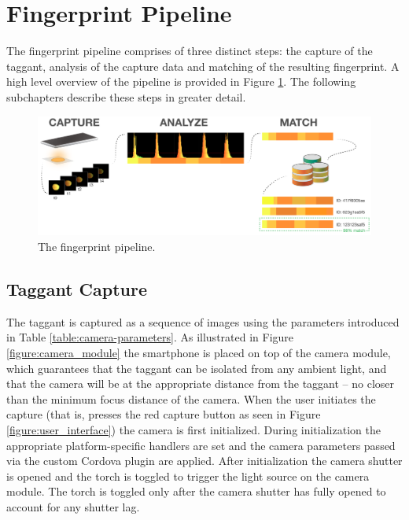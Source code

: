 \documentclass[thesis.tex]{subfiles}
\begin{document}
\section{Fingerprint Pipeline}
\label{chapter:fingerprint-pipeline}

The fingerprint pipeline comprises of three distinct steps: the capture of the taggant, analysis of the capture data and matching of the resulting fingerprint. A high level overview of the pipeline is provided in Figure \ref{figure:fingerprint-pipeline}. The following subchapters describe these steps in greater detail.

\begin{figure}[h]
\centering \includegraphics[width=\textwidth,height=\textheight,keepaspectratio=true]{images/design_implementation/fingerprint_pipeline.pdf}
\caption{The fingerprint pipeline. \label{figure:fingerprint-pipeline}}
\end{figure}

\subsection{Taggant Capture}

The taggant is captured as a sequence of images using the parameters introduced in Table \ref{table:camera-parameters}. As illustrated in Figure \ref{figure:camera_module} the smartphone is placed on top of the camera module, which guarantees that the taggant can be isolated from any ambient light, and that the camera will be at the appropriate distance from the taggant -- no closer than the minimum focus distance of the camera. When the user initiates the capture (that is, presses the red capture button as seen in Figure \ref{figure:user_interface}) the camera is first initialized. During initialization the appropriate platform-specific handlers are set and the camera parameters passed via the custom Cordova plugin are applied. After initialization the camera shutter is opened and the torch is toggled to trigger the light source on the camera module. The torch is toggled only after the camera shutter has fully opened to account for any shutter lag.
\end{document}
